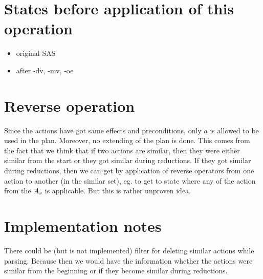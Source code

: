 	\section{States before application of this operation}
	\begin{itemize}
		\item original SAS
		\item after -dv, -mv, -oe
	\end{itemize}
	
	
	\section{Reverse operation}
	Since the actions have got same effects and preconditions, only $a$ is allowed to be used in the plan. Moreover, no extending of the plan is done. This comes from the fact that we think that if two actions are similar, then they were either similar from the start or they got similar during reductions. If they got similar during reductions, then we can get by application of reverse operators from one action to another (in the similar set), eg. to get to state where any of the action from the $A{}_s$ is applicable. But this is rather unproven idea.
	
	\section{Implementation notes}
	There could be (but is not implemented) filter for deleting similar actions while parsing. Because then we would have the information whether the actions were similar from the beginning or if they become similar during reductions.
	
	
	
	
